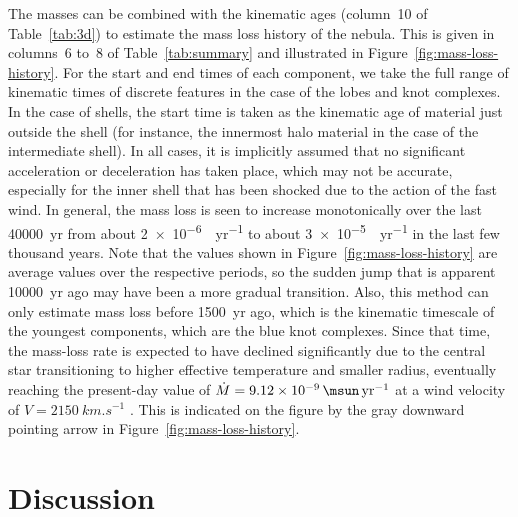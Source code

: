 \documentclass[useAMS, usenatbib]{mnras}
\begin{document}
The masses can be combined with the kinematic ages (column~10 of Table~\ref{tab:3d}) to estimate the mass loss history of the nebula.
This is given in columns~6 to~8 of Table~\ref{tab:summary} and illustrated in Figure~\ref{fig:mass-loss-history}.
For the start and end times of each component, we take the full range of kinematic times of discrete features in the case of the lobes and knot complexes.
In the case of shells, the start time is taken as the kinematic age of material just outside the shell (for instance, the innermost halo material in the case of the intermediate shell).
In all cases, it is implicitly assumed that no significant acceleration or deceleration has taken place,
which may not be accurate, especially for the inner shell that has been shocked due to the action of the fast wind.
In general, the mass loss is seen to increase monotonically over the last \SI{40000}{yr} from about \SI{2e-6}{\msun.yr^{-1}} to about \SI{3e-5}{\msun.yr^{-1}} in the last few thousand years.
Note that the values shown in Figure~\ref{fig:mass-loss-history} are average values over the respective periods,
so the sudden jump that is apparent \SI{10000}{yr} ago may have been a more gradual transition.
Also, this method can only estimate mass loss before \SI{1500}{yr} ago, which is the kinematic timescale of the youngest components,
which are the blue knot complexes.
Since that time, the mass-loss rate is expected to have declined significantly
due to the central star transitioning to higher effective temperature and smaller radius,
eventually reaching the present-day value of \(\dot{M} = \SI{9.12e-9}{\msun.yr^{-1}}\) at a wind velocity of \(V = \SI{2150}{km.s^{-1}}\) \citep{Herald:2011a}.
This is indicated on the figure by the gray downward pointing arrow
in Figure~\ref{fig:mass-loss-history}.




\section{Discussion}
\label{sec:discussion}
\end{document}
